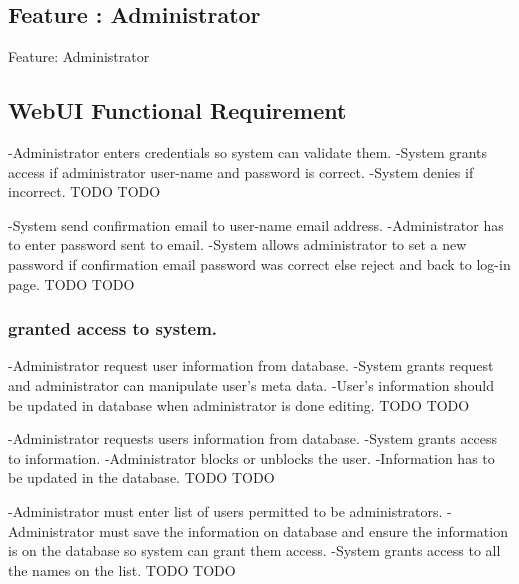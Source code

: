 \begin{Requirements}
\section{Feature : Administrator}
Feature:  Administrator 
\subsection{ WebUI Functional Requirement}

	  	{-Administrator enters credentials so system can validate them.
	 	-System grants access if administrator user-name and password is correct.
	 	-System denies if incorrect.}
	 	{TODO}
        	{TODO}
	  
		
		{-System send confirmation email to user-name email address.
		-Administrator has to enter password sent to email.
	  	-System allows administrator to set a new password if confirmation email password was correct else reject and back to 			 log-in page.}
	  	{TODO}
		{TODO}
\subsubsection{granted access to system.}
 
		{-Administrator request user information from database.
		-System grants request and administrator can manipulate user's meta data.
		-User's information should be updated in database when administrator is done editing.}
		{TODO}
       		{TODO}
       
		{-Administrator requests users information from database.
		-System grants access to information.
		-Administrator blocks or unblocks the user.
		-Information has to be updated in the database.}
		{TODO}
        	{TODO}
		
		
		{-Administrator must enter list of users permitted to be administrators.
		-Administrator must save the information on database and ensure the information     		     			 		  is on the database so system can grant them access.
		-System grants access to all the names on the list.}
		{TODO}
        	{TODO}
		

\end{Requirements}
